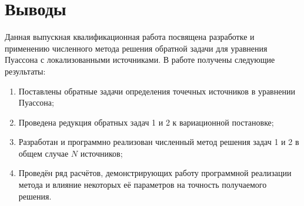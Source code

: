 \section{Выводы}
Данная выпускная квалификационная работа посвящена разработке и применению численного метода решения обратной задачи для уравнения Пуассона с локализованными источниками. В работе получены следующие результаты:
\begin{enumerate}
    \item Поставлены обратные задачи определения точечных источников в уравнении Пуассона;
    \item Проведена редукция обратных задач 1 и 2 к вариационной постановке;
    \item Разработан и программно реализован численный метод решения задач 1 и 2 в общем случае $N$ источников;
    \item Проведён ряд расчётов, демонстрирующих работу программной реализации метода и влияние некоторых её параметров на точность получаемого решения.
\end{enumerate}
